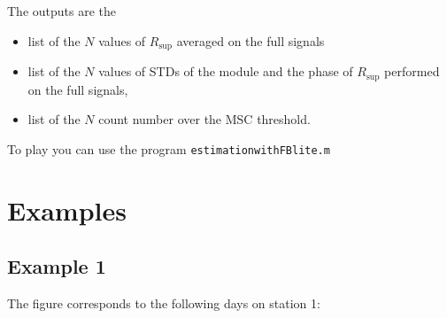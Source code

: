 \documentclass[a4paper, 12pt]{report}
\begin{document}
The outputs are the 
\begin{itemize}
\item
list of the $N$ values of  $R_{\sup}$ averaged on the full signals
\item
list of the $N$ values of  STDs of the module and the phase of $R_{\sup}$ performed on the full signals,
\item
list of the $N$ count number over the MSC threshold.                                                                                                                                                                                                                                                                                                                                                                                                                                                                                                                                                                                                                                                                                                                                                                                                                                                                                                                                                                                                                                                                                                                                                                                                                                                                                                                                                                                                                                                                                                                                                                                         
\end{itemize}

To play you can use the program { \tt estimationwithFBlite.m}


 \newpage
\section{Examples}


\subsection{Example 1}
The figure corresponds to the following days on station 1:
\end{document}
